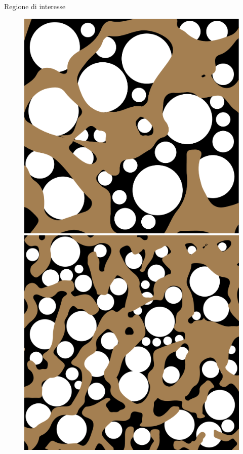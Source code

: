 \documentclass[aspectratio=169,xcolor=dvipsnames]{beamer}
\begin{document}
\begin{frame}{Regione di interesse}
\begin{figure}
\begin{minipage}[c]{0.20\linewidth}
			\includegraphics[width=\linewidth]{real_mesh_n1.png}
		\end{minipage}\hspace{0.01\linewidth}
		\begin{minipage}[c]{0.20\linewidth}
			\includegraphics[width=\linewidth]{real_mesh_n2.png}
		\end{minipage}
	

\end{figure}
\end{frame}
\end{document}
